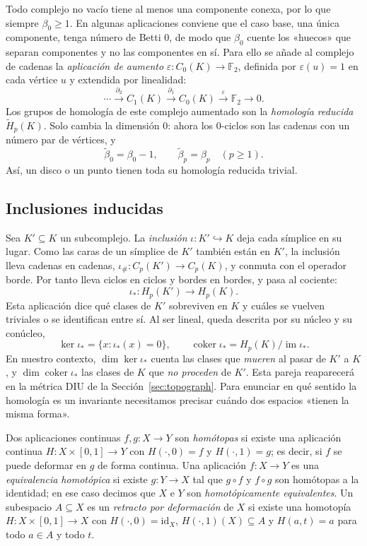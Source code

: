 \begin{observacion}
Todo complejo no vacío tiene al menos una componente conexa, por lo que
siempre $\beta_0\ge1$. En algunas aplicaciones conviene que el caso base,
una única componente, tenga número de Betti $0$, de modo que $\beta_0$
cuente los «huecos» que separan componentes y no las componentes en sí.
Para ello se añade al complejo de cadenas la \emph{aplicación de aumento}
$\varepsilon:C_0(K)\to\mathbb{F}_2$, definida por $\varepsilon(u)=1$ en
cada vértice $u$ y extendida por linealidad:
\[
  \cdots\xrightarrow{\partial_2}C_1(K)\xrightarrow{\partial_1}C_0(K)
  \xrightarrow{\varepsilon}\mathbb{F}_2\to0.
\]
Los grupos de homología de este complejo aumentado son la
\emph{homología reducida} $\tilde H_p(K)$. Solo cambia la dimensión $0$:
ahora los $0$-ciclos son las cadenas con un número par de vértices, y
\[
  \tilde\beta_0=\beta_0-1,\qquad \tilde\beta_p=\beta_p\quad(p\ge1).
\]
Así, un disco o un punto tienen toda su homología reducida trivial.
\end{observacion}

\subsection{Inclusiones inducidas}

Sea $K'\subseteq K$ un subcomplejo. La \emph{inclusión} $\iota:K'\hookrightarrow K$
deja cada símplice en su lugar. Como las caras de un símplice de $K'$ también
están en $K'$, la inclusión lleva cadenas en cadenas,
$\iota_\#:C_p(K')\to C_p(K)$, y conmuta con el operador borde. Por tanto lleva
ciclos en ciclos y bordes en bordes, y pasa al cociente:
\[
  \iota_*:H_p(K')\to H_p(K).
\]
Esta aplicación dice qué clases de $K'$ sobreviven en $K$ y cuáles se vuelven
triviales o se identifican entre sí. Al ser lineal, queda descrita por su
núcleo y su conúcleo,
\[
  \ker\iota_*=\{x : \iota_*(x)=0\},\qquad
  \operatorname{coker}\iota_*=H_p(K)/\operatorname{im}\iota_*.
\]
En nuestro contexto, $\dim\ker\iota_*$ cuenta las clases que \emph{mueren} al
pasar de $K'$ a $K$, y $\dim\operatorname{coker}\iota_*$ las clases de $K$ que
\emph{no proceden} de $K'$. Esta pareja reaparecerá en la métrica DIU de la
Sección~\ref{sec:topograph}.
Para enunciar en qué sentido la homología es un invariante necesitamos
precisar cuándo dos espacios «tienen la misma forma».

\begin{definicion}
\label{def:homotopia}
Dos aplicaciones continuas $f,g:X\to Y$ son \emph{homótopas} si existe una
aplicación continua $H:X\times[0,1]\to Y$ con $H(\cdot,0)=f$ y
$H(\cdot,1)=g$; es decir, si $f$ se puede deformar en $g$ de forma
continua. Una aplicación $f:X\to Y$ es una \emph{equivalencia homotópica}
si existe $g:Y\to X$ tal que $g\circ f$ y $f\circ g$ son homótopas a la
identidad; en ese caso decimos que $X$ e $Y$ son \emph{homotópicamente
equivalentes}. Un subespacio $A\subseteq X$ es un \emph{retracto por
deformación} de $X$ si existe una homotopía $H:X\times[0,1]\to X$ con
$H(\cdot,0)=\mathrm{id}_X$, $H(\cdot,1)(X)\subseteq A$ y $H(a,t)=a$ para
todo $a\in A$ y todo $t$.
\end{definicion}

